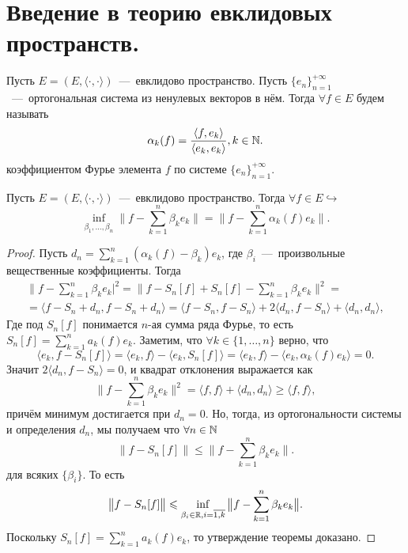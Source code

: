\section{Введение в теорию евклидовых пространств.}
\begin{definition}
    Пусть $E = (E, \langle \cdot, \cdot \rangle)$~---~евклидово пространство. Пусть $\{e_n\}_{n = 1}^{+\infty}$~---~ортогональная система из ненулевых векторов в нём.
    Тогда $\forall f \in E$ будем называть
    \begin{equation*}
        \alpha_k(f) = \dfrac{\langle f, e_k \rangle}{\langle e_k, e_k \rangle}, k \in \mathbb{N}.
    \end{equation*}
    коэффициентом Фурье элемента $f$ по системе $\{e_n\}_{n = 1}^{+\infty}$.
\end{definition}
\begin{theorem}
    Пусть $E = (E, \langle \cdot, \cdot \rangle)$~---~евклидово пространство. Тогда $\forall f \in E \hookrightarrow$
    \begin{equation*}
        \inf\limits_{\beta_1, \ldots, \beta_n} \bigr\|f - \sum\limits_{k = 1}^n \beta_k e_k\bigr\| = \bigr\|f - \sum\limits_{k = 1}^n \alpha_k(f)e_k\bigr\|.
    \end{equation*}
\end{theorem}
\begin{proof}
    Пусть $d_n = \sum\limits_{k = 1}^n (\alpha_k(f) - \beta_k) e_k$, где $\beta_i$~---~произвольные вещественные коэффициенты.
    Тогда
    \begin{multline*}
        \big\|f - \sum\limits_{k = 1}^n \beta_{k}e_k\big|^2 = \big\|f - S_n[f] + S_n[f] - \sum\limits_{k = 1}^n \beta_k e_k\big\|^2 = \\ =
        \langle f - S_n + d_n, f - S_n + d_n \rangle = \langle f - S_n, f - S_n \rangle + 2 \langle d_n, f - S_n \rangle + \langle d_n, d_n \rangle,
    \end{multline*}
    Где под $S_n[f]$ понимается $n$-ая сумма ряда Фурье, то есть $S_n[f] = \sum\limits_{k = 1}^n a_k(f)e_k$.
    Заметим, что $\forall k \in \{1, \ldots, n\}$ верно, что
    \[
        \langle e_k, f - S_n[f] \rangle = \langle e_k, f \rangle - \langle e_k, S_n[f] \rangle = \langle e_k, f \rangle - \langle e_k, \alpha_k(f)e_k \rangle = 0.
    \]
    Значит $2\langle d_n, f - S_n \rangle = 0$, и квадрат отклонения выражается как
    \begin{equation*}
        \big\|f - \sum\limits_{k = 1}^n \beta_k e_k\big\|^2 = \langle f, f \rangle + \langle d_n, d_n \rangle \geq \langle f, f \rangle,
    \end{equation*}
    причём минимум достигается при $d_n = 0$.
    Но, тогда, из ортогональности системы и определения $d_n$, мы получаем что $\forall n \in \mathbb{N}$
    \begin{equation*}
        \big\|f - S_n[f]\big\| \leq \big\|f - \sum\limits_{k = 1}^n \beta_k e_k\big\|.
    \end{equation*}
    для всяких $\{\beta_i\}$. То есть
    \[
        \big\|f - S_n[f]\big\| \leqslant \inf\limits_{\beta_i \in \mathbb{R}, i = \overline{1, k}} \big\|f - \sum\limits_{k = 1}^n \beta_{k}e_k\big\|.
    \]
    Поскольку $S_n[f] = \sum\limits_{k = 1}^n a_k(f)e_k$, то утверждение теоремы доказано.
\end{proof}
